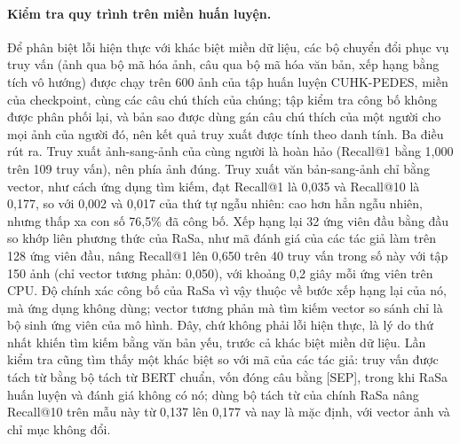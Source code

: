 \paragraph{Kiểm tra quy trình trên miền huấn luyện.} Để phân biệt lỗi hiện thực với khác biệt miền dữ liệu, các bộ chuyển đổi phục vụ truy vấn (ảnh qua bộ mã hóa ảnh, câu qua bộ mã hóa văn bản, xếp hạng bằng tích vô hướng) được chạy trên 600 ảnh của tập huấn luyện CUHK-PEDES, miền của checkpoint, cùng các câu chú thích của chúng; tập kiểm tra công bố không được phân phối lại, và bản sao được dùng gán câu chú thích của một người cho mọi ảnh của người đó, nên kết quả truy xuất được tính theo danh tính. Ba điều rút ra. Truy xuất ảnh-sang-ảnh của cùng người là hoàn hảo (Recall@1 bằng 1,000 trên 109 truy vấn), nên phía ảnh đúng. Truy xuất văn bản-sang-ảnh chỉ bằng vector, như cách ứng dụng tìm kiếm, đạt Recall@1 là 0,035 và Recall@10 là 0,177, so với 0,002 và 0,017 của thứ tự ngẫu nhiên: cao hơn hẳn ngẫu nhiên, nhưng thấp xa con số 76,5\% đã công bố. Xếp hạng lại 32 ứng viên đầu bằng đầu so khớp liên phương thức của RaSa, như mã đánh giá của các tác giả làm trên 128 ứng viên đầu, nâng Recall@1 lên 0,650 trên 40 truy vấn trong số này với tập 150 ảnh (chỉ vector tương phản: 0,050), với khoảng 0,2 giây mỗi ứng viên trên CPU. Độ chính xác công bố của RaSa vì vậy thuộc về bước xếp hạng lại của nó, mà ứng dụng không dùng; vector tương phản mà tìm kiếm vector so sánh chỉ là bộ sinh ứng viên của mô hình. Đây, chứ không phải lỗi hiện thực, là lý do thứ nhất khiến tìm kiếm bằng văn bản yếu, trước cả khác biệt miền dữ liệu. Lần kiểm tra cũng tìm thấy một khác biệt so với mã của các tác giả: truy vấn được tách từ bằng bộ tách từ BERT chuẩn, vốn đóng câu bằng [SEP], trong khi RaSa huấn luyện và đánh giá không có nó; dùng bộ tách từ của chính RaSa nâng Recall@10 trên mẫu này từ 0,137 lên 0,177 và nay là mặc định, với vector ảnh và chỉ mục không đổi.

